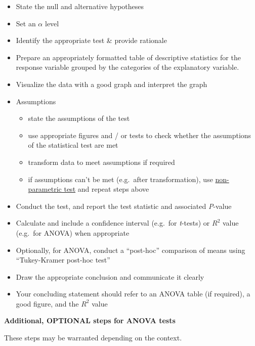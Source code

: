 \documentclass[
]{book}
\providecommand{\tightlist}{%
  \setlength{\itemsep}{0pt}\setlength{\parskip}{0pt}}
\begin{document}
\begin{itemize}
\tightlist
\item
  State the null and alternative hypotheses\\
\item
  Set an \(\alpha\) level
\item
  Identify the appropriate test \& provide rationale
\item
  Prepare an appropriately formatted table of descriptive statistics for the response variable grouped by the categories of the explanatory variable.\\
\item
  Visualize the data with a good graph and interpret the graph
\item
  Assumptions

  \begin{itemize}
  \tightlist
  \item
    state the assumptions of the test\\
  \item
    use appropriate figures and / or tests to check whether the assumptions of the statistical test are met
  \item
    transform data to meet assumptions if required
  \item
    if assumptions can't be met (e.g.~after transformation), use \hyperref[assumpbad_anova]{non-parametric test} and repeat steps above
  \end{itemize}
\item
  Conduct the test, and report the test statistic and associated \emph{P}-value\\
\item
  Calculate and include a confidence interval (e.g.~for \emph{t}-tests) or \(R^2\) value (e.g.~for ANOVA) when appropriate\\
\item
  Optionally, for ANOVA, conduct a ``post-hoc'' comparison of means using ``Tukey-Kramer post-hoc test''
\item
  Draw the appropriate conclusion and communicate it clearly\\
\item
  Your concluding statement should refer to an ANOVA table (if required), a good figure, and the \(R^2\) value
\end{itemize}

\textbf{Additional, OPTIONAL steps for ANOVA tests}

These steps may be warranted depending on the context.
\end{document}
